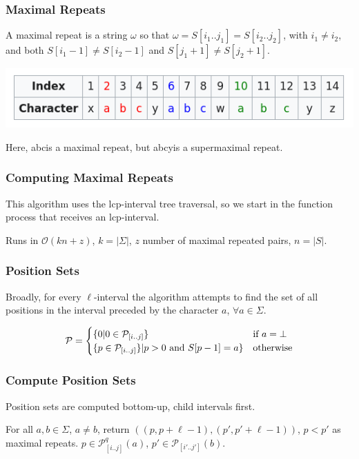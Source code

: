 \documentclass[compress,handout]{beamer} %
\renewcommand{\O}{\mathcal{O}}
\begin{document}
\begin{frame}
	\frametitle{Maximal Repeats}
	A maximal repeat is a string $\omega$ so that
	$\omega=S[i_1..j_1]=S[i_2..j_2]$, with $i_1 \ne i_2$, and both
	$S[i_1-1] \ne S[i_2-1]$ and $S[j_1+1] \ne S[j_2+1]$.

	\includegraphics[width=\textwidth, height=\textheight, keepaspectratio=true]{maximal_pair}

	Here, \dq abc\dq is a maximal repeat, but \dq abcy\dq is a supermaximal
	repeat.
\end{frame}

\begin{frame}
	\frametitle{Computing Maximal Repeats}
	This algorithm uses the lcp-interval tree traversal, so we start
	in the function process that receives an lcp-interval.

	Runs in $\O(kn+z)$, $k=|\Sigma|$, $z$ number of maximal repeated
	pairs, $n=|S|$.
\end{frame}

\begin{frame}
	\frametitle{Position Sets}
	Broadly, for every $\ell$-interval the algorithm attempts to
	find the set of all positions in the interval preceded by the
	character $a$, $\forall a \in \Sigma$.

	\begin{equation}
	\mathcal{P}=
	\begin{cases}
		\{ 0 | 0 \in \mathcal{P}_{[i..j]}\} & \text{if $a = \bot$} \\
		\{ p \in \mathcal{P}_{[i..j]}\} | p>0\hbox{ and } S[p-1]=a\} & \text{otherwise}
	\end{cases}
	\end{equation}
\end{frame}

\begin{frame}
	\frametitle{Compute Position Sets}
	Position sets are computed bottom-up, child intervals first.

	\vspace{2mm}
	For all $a,b \in \Sigma$, $a \ne b$, return $((p,p+\ell -1),
	(p',p'+\ell -1))$, $p<p'$ as maximal repeats.
	$p\in \mathcal{P}^{q}_{[i..j]}(a)$, $p'\in
	\mathcal{P}_{[i'..j']}(b)$.
\end{frame}
\end{document}
